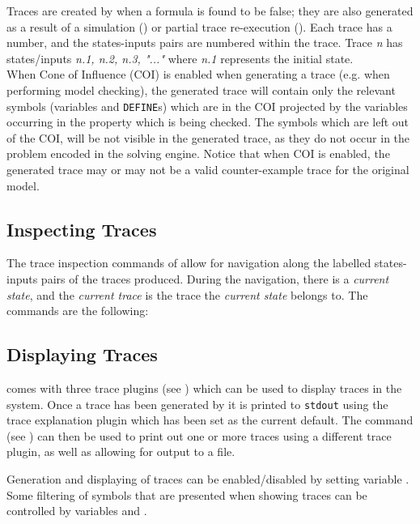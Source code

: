 Traces are created by \nusmv when a formula is found to be false; they
are also generated as a result of a simulation () or partial trace re-execution (). Each trace has a number, and the states-inputs pairs are
numbered within the trace.  Trace {\it n} has states/inputs {\it n.1,
  n.2, n.3, "..."} where \textit{n.1} represents the initial state.\\

When Cone of Influence (COI) is enabled when generating a trace
(e.g. when performing model checking), the generated trace will
contain only the relevant symbols (variables and \texttt{DEFINE}s) which are
in the COI projected by the variables occurring in the property
which is being checked. The symbols which are left out of the COI,
will be not visible in the generated trace, as they do not occur in
the problem encoded in the solving engine. Notice that when COI is
enabled, the generated trace may or may not be a valid
counter-example trace for the original model.

\subsection{Inspecting Traces}
\label{Inspecting Traces}
%
The trace inspection commands of \nusmv allow for navigation along the
labelled states-inputs pairs of the traces produced. During the
navigation, there is a {\it current state}, and the {\it current
trace} is the trace the {\it current state} belongs to. The commands
are the following:





\subsection{Displaying Traces}
\label{Displaying Traces}
%
\nusmv comes with three trace plugins (see ) which
can be used to display traces in the system. Once a trace has been
generated by \nusmv it is printed to \texttt{stdout} using the trace
explanation plugin which has been set as the current default. The
command  (see ) can
then be used to print out one or more traces using a different trace
plugin, as well as allowing for output to a file.

Generation and displaying of traces can be enabled/disabled by
setting variable . Some filtering of
symbols that are presented when showing traces can be controlled
by variables  and
.

